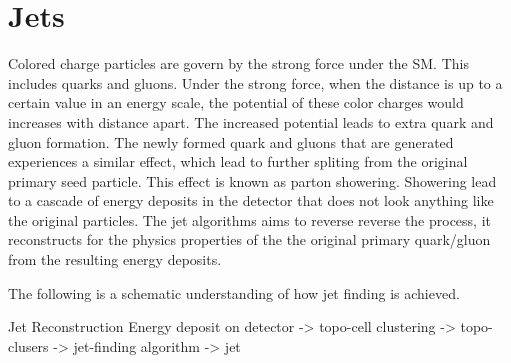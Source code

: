%
%
%
%
%
%

\section{Jets}
Colored charge particles are govern by the strong force under the SM. This includes quarks and gluons. Under the strong force, when the distance is up to a certain value in an energy scale, the potential of these color charges would increases with distance apart. The increased potential leads to extra quark and gluon formation. The newly formed quark and gluons that are generated experiences a similar effect, which lead to further spliting from the original primary seed particle. This effect is known as parton showering. 
Showering lead to a cascade of energy deposits in the detector that does not look anything like the original particles. The jet algorithms aims to reverse reverse the process, it reconstructs for the physics properties of the the original primary quark/gluon from the resulting energy deposits. 

The following is a schematic understanding of how jet finding is achieved. 

Jet Reconstruction
Energy deposit on detector  -> topo-cell clustering -> topo-clusers -> jet-finding algorithm -> jet

